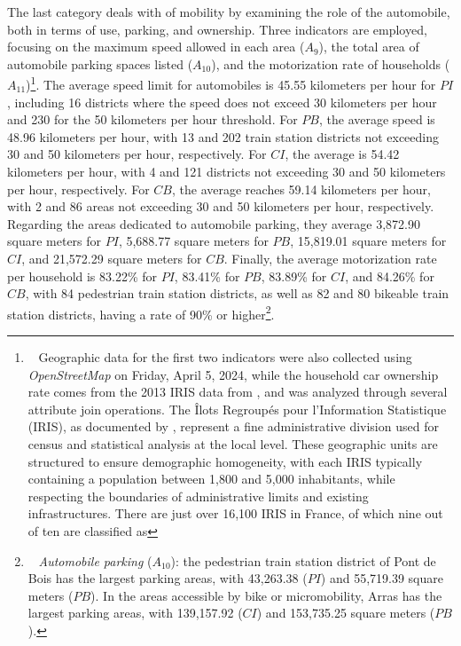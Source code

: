 \begin{refsegment}
The last category deals with  of mobility by examining the role of the automobile, both in terms of use, parking, and ownership. Three indicators are employed, focusing on the maximum speed allowed in each area (\(A_{9}\)), the total area of automobile parking spaces listed (\(A_{10}\)), and the motorization rate of households (\(A_{11}\))\footnote{~
    Geographic data for the first two indicators were also collected using \textsl{OpenStreetMap} on Friday, April 5, 2024, while the household car ownership rate comes from the 2013 IRIS data from \textcolor{blue}{\textcite{insee_documentation_2018}}, and was analyzed through several attribute join operations. The Îlots Regroupés pour l'Information Statistique (IRIS), as documented by \textcolor{blue}{\textcite{insee_documentation_2018}}, represent a fine administrative division used for census and statistical analysis at the local level. These geographic units are structured to ensure demographic homogeneity, with each IRIS typically containing a population between 1,800 and 5,000 inhabitants, while respecting the boundaries of administrative limits and existing infrastructures. There are just over 16,100 IRIS in France, of which nine out of ten are classified as 
}. The average speed limit for automobiles is 45.55 kilometers per hour for \(PI\), including 16 districts where the speed does not exceed 30 kilometers per hour and 230 for the 50 kilometers per hour threshold. For \(PB\), the average speed is 48.96 kilometers per hour, with 13 and 202 train station districts not exceeding 30 and 50 kilometers per hour, respectively. For \(CI\), the average is 54.42 kilometers per hour, with 4 and 121 districts not exceeding 30 and 50 kilometers per hour, respectively. For \(CB\), the average reaches 59.14 kilometers per hour, with 2 and 86 areas not exceeding 30 and 50 kilometers per hour, respectively. Regarding the areas dedicated to automobile parking, they average 3,872.90 square meters for \(PI\), 5,688.77 square meters for \(PB\), 15,819.01 square meters for \(CI\), and 21,572.29 square meters for \(CB\). Finally, the average motorization rate per household is 83.22\% for \(PI\), 83.41\% for \(PB\), 83.89\% for \(CI\), and 84.26\% for \(CB\), with 84 pedestrian train station districts, as well as 82 and 80 bikeable train station districts, having a rate of 90\% or higher\footnote{~
    \textsl{Automobile parking} (\(A_{10}\)): the pedestrian train station district of Pont de Bois has the largest parking areas, with 43,263.38 (\(PI\)) and 55,719.39 square meters (\(PB\)). In the areas accessible by bike or micromobility, Arras has the largest parking areas, with 139,157.92 (\(CI\)) and 153,735.25 square meters (\(PB\)).
}.


\end{refsegment}
